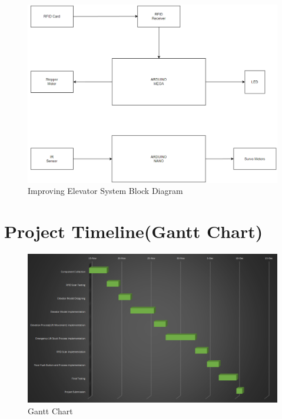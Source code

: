 \documentclass{lxaiproposal}
\begin{document}
\begin{figure} [h!]
    \centering
    \includegraphics[width=1\linewidth]{images/Improving Elevator System Block Diagram.png}
    \caption{Improving Elevator System Block Diagram}
    \label{fig:my-fig}
\end{figure}

\newpage %

\section{Project Timeline(Gantt Chart)}
\vspace*{-3mm}

\begin{figure} [h!]
    \centering
    \includegraphics[width=1\linewidth]{images/GANN CHART.png}
    \caption{Gantt Chart}
    \label{fig:my-fig}
\end{figure}













\end{document}
